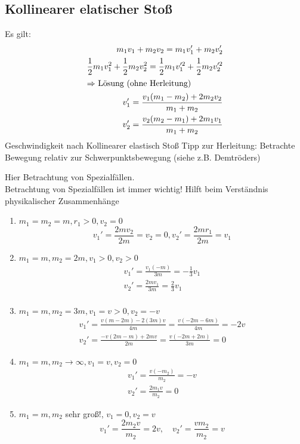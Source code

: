 \documentclass[a4paper]{scrartcl}
\theoremstyle{definition}
\theoremstyle{plain}
\theoremstyle{plain}
\theoremstyle{remark}
\theoremstyle{remark}
\theoremstyle{remark}
\begin{document}
\subsection{Kollinearer elatischer Stoß}
\label{sec-7-1}
Es gilt:
\begin{align*}
m_1 v_1 + m_2 v_2 = m_1 v_1' + m_2 v_2' \\
\frac{1}{2} m_1 v_1^2 + \frac{1}{2} m_2 v_2^2 = \frac{1}{2} m_1 v_1^{\prime 2} + \frac{1}{2} m_2 v_2^{\prime 2} \\
\intertext{$\Rightarrow$ Lösung (ohne Herleitung)}
v_1' = \frac{v_1(m_1 - m_2) + 2m_2 v_2}{m_1 + m_2} \\
v_2' = \frac{v_2(m_2 - m_1) + 2m_1 v_1}{m_1 + m_2}
\end{align*}
Geschwindigkeit nach Kollinearer elastisch Stoß
Tipp zur Herleitung: Betrachte Bewegung relativ zur Schwerpunktsbewegung (siehe z.B. Demtröders)

Hier Betrachtung von Spezialfällen. \\
   Betrachtung von Spezialfällen ist immer wichtig! Hilft beim Verständnis physikalischer Zusammenhänge
\begin{enumerate}
\item $m_1 = m_2 = m, r_1 > 0, v_2 = 0$
      \[v_1' = \frac{2 m v_2}{2 m} = v_2 = 0, v_2' = \frac{2m r_1}{2 m} = v_1\]
\item $m_1 = m, m_2 = 2 m, v_1 > 0, v_2 > 0$
\begin{align*}
v_1' = \frac{v_1 (- m)}{3 m} = - \frac{1}{3}v_1 \\
v_2' = \frac{2m v_1}{3 m} = \frac{2}{3}v_1 \\
\end{align*}
\item $m_1 = m, m_2 = 3m, v_1 = v > 0, v_2 = -v$
\begin{align*}
v_1' = \frac{v(m - 2m) - 2(3m) v}{4m} = \frac{v(-2m - 6m)}{4m} = -2v \\
v_2' = \frac{-v(2m - m) + 2mv}{2m} = \frac{v(-2m + 2m)}{3m} = 0
\end{align*}
\item $m_1 = m, m_2 \to \infty, v_1 = v, v_2 = 0$
\begin{align*}
v_1' = \frac{v(-m_2)}{m_2} = -v \tag{da $m_1$ vernachlässigbar} \\
v_2' = \frac{2 m_1 v}{m_2} = 0 \tag{da $m_1 \ll m_2$}
\end{align*}
\item $m_1 = m, m_2$ sehr groß!, $v_1 = 0, v_2 = v$
      \[v_1' = \frac{2m_2 v}{m_2} = 2v,\quad v_2' = \frac{v m_2}{m_2} = v\]
\end{enumerate}
\end{document}
